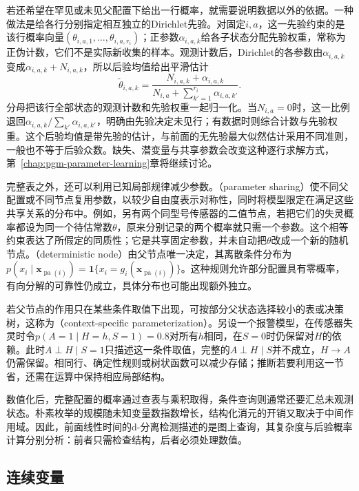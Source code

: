 若还希望在罕见或未见父配置下给出一行概率，就需要说明数据以外的依据。一种做法是给各行分别指定相互独立的Dirichlet先验。对固定$i,a$，这一先验约束的是该行概率向量$(\theta_{i,a,1},\ldots,\theta_{i,a,r_i})$；正参数$\alpha_{i,a,k}$给各子状态分配先验权重，常称为正伪计数，它们不是实际新收集的样本。观测计数后，Dirichlet的各参数由$\alpha_{i,a,k}$变成$\alpha_{i,a,k}+N_{i,a,k}$，所以后验均值给出平滑估计
\[
  \widetilde\theta_{i,a,k}
    =\frac{N_{i,a,k}+\alpha_{i,a,k}}
      {N_{i,a}+\sum_{k'=1}^{r_i}\alpha_{i,a,k'}}.
\]
分母把该行全部状态的观测计数和先验权重一起归一化。当$N_{i,a}=0$时，这一比例退回$\alpha_{i,a,k}/\sum_{k'}\alpha_{i,a,k'}$，明确由先验决定未见行；有数据时则综合计数与先验权重。这个后验均值是带先验的估计，与前面的无先验最大似然估计采用不同准则，一般也不等于后验众数。缺失、潜变量与共享参数会改变这种逐行求解方式，第~\ref{chap:pgm-parameter-learning}章将继续讨论。

完整表之外，还可以利用已知局部规律减少参数。（parameter sharing）使不同父配置或不同节点复用参数，以较少自由度表示对称性，同时将模型限定在满足这些共享关系的分布中。例如，另有两个同型号传感器的二值节点，若把它们的失灵概率都设为同一个待估常数$\theta$，原来分别记录的两个概率就只需一个参数。这个相等约束表达了所假定的同质性；它是共享固定参数，并未自动把$\theta$改成一个新的随机节点。（deterministic node）由父节点唯一决定，其离散条件分布为$p(x_i\mid\bm{x}_{\operatorname{pa}(i)})=\mathbf{1}\{x_i=g_i(\bm{x}_{\operatorname{pa}(i)})\}$。这种规则允许部分配置具有零概率，有向分解的可靠性仍成立，具体分布也可能出现额外独立。

若父节点的作用只在某些条件取值下出现，可按部分父状态选择较小的表或决策树，这称为（context-specific parameterization）。另设一个报警模型，在传感器失灵时令$p(A=1\mid H=h,S=1)=0.8$对所有$h$相同，在$S=0$时仍保留对$H$的依赖。此时$A\perp H\mid S=1$只描述这一条件取值，完整的$A\perp H\mid S$并不成立，$H\to A$仍需保留。相同行、确定性规则或树状函数可以减少存储；推断若要利用这一节省，还需在运算中保持相应局部结构。

数值化后，完整配置的概率通过查表与乘积取得，条件查询则通常还要汇总未观测状态。朴素枚举的规模随未知变量数指数增长，结构化消元的开销又取决于中间作用域。因此，前面线性时间的d-分离检测描述的是图上查询，其复杂度与后验概率计算分别分析：前者只需检查结构，后者必须处理数值。

\subsection{连续变量}
\label{sec:pgm-directed-continuous}

